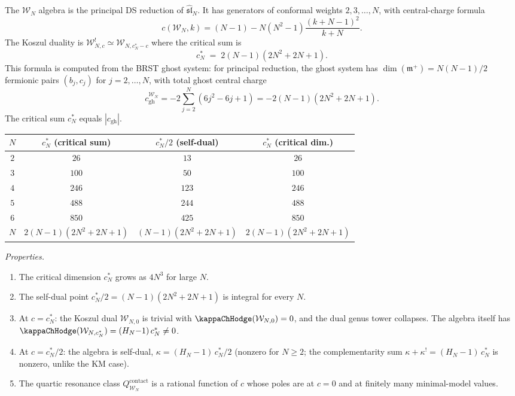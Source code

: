 \begin{computation}
The $\mathcal{W}_N$ algebra is the principal DS reduction of
$\widehat{\mathfrak{sl}}_N$.
It has generators of conformal weights $2, 3, \dots, N$, with
central-charge formula
\[
c(\mathcal{W}_N, k)
= (N-1) - N(N^2-1)\frac{(k+N-1)^2}{k+N}.
\]
The Koszul duality is
$\mathcal{W}_{N,c}^! \simeq \mathcal{W}_{N,c_N^*-c}$
where the critical sum is
\begin{equation}%
c_N^* \;=\; 2(N-1)(2N^2 + 2N + 1).
\end{equation}
This formula is computed from the BRST ghost system:
for principal reduction, the ghost system has
$\dim(\mathfrak{m}^+) = N(N-1)/2$ fermionic pairs
$(b_j, c_j)$ for $j = 2, \dots, N$, with total ghost
central charge
\[
c_{\mathrm{gh}}^{\mathcal{W}_N}
= -2\sum_{j=2}^{N}(6j^2 - 6j + 1)
= -2(N-1)(2N^2 + 2N + 1).
\]
The critical sum $c_N^*$ equals $|c_{\mathrm{gh}}|$.

\begin{center}
\renewcommand{\arraystretch}{1.3}
\begin{tabular}{cccc}
$N$ & $c_N^*$ (critical sum) & $c_N^*/2$ (self-dual) &
$c_N^*$ (critical dim.) \\
\hline
$2$ & $26$ & $13$ & $26$ \\
$3$ & $100$ & $50$ & $100$ \\
$4$ & $246$ & $123$ & $246$ \\
$5$ & $488$ & $244$ & $488$ \\
$6$ & $850$ & $425$ & $850$ \\
$N$ & $2(N{-}1)(2N^2{+}2N{+}1)$ & $(N{-}1)(2N^2{+}2N{+}1)$ &
$2(N{-}1)(2N^2{+}2N{+}1)$
\end{tabular}
\end{center}

\emph{Properties.}
\begin{enumerate}[label=\textup{(\roman*)}]
\item The critical dimension $c_N^*$ grows as $4N^3$ for
 large $N$.
\item The self-dual point
 \(c_N^*/2=(N-1)(2N^2+2N+1)\) is integral for every \(N\).
\item At $c = c_N^*$: the Koszul dual $\mathcal{W}_{N,0}$
 is trivial with $\kappaChHodge(\mathcal{W}_{N,0}) = 0$, and
 the dual genus tower collapses. The algebra itself
 has $\kappaChHodge(\mathcal{W}_{N,c_N^*}) = (H_N{-}1)\,c_N^* \neq 0$.
\item At $c = c_N^*/2$: the algebra is self-dual,
 $\kappa = (H_N{-}1)\,c_N^*/2$ (nonzero for $N \ge 2$;
 the complementarity sum $\kappa + \kappa^! = (H_N{-}1)\,c_N^*$
 is nonzero, unlike the KM case).
\item The quartic resonance class
 $Q^{\mathrm{contact}}_{\mathcal{W}_N}$ is a rational
 function of $c$ whose poles are at $c = 0$ and at
 finitely many minimal-model values.
\end{enumerate}
\end{computation}

